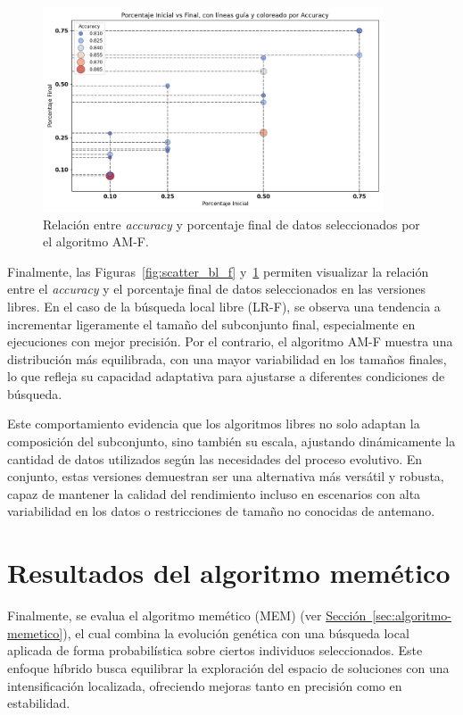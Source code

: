 \begin{figure}[htp]
    \centering
    \includegraphics[width=0.9\textwidth]{imagenes/evaluaciones/libres/scatter_gen_v2}
    \caption{Relación entre \textit{accuracy} y porcentaje final de datos seleccionados por el algoritmo AM-F.}
    \label{fig:scatter_gen_v2}
\end{figure}

Finalmente, las Figuras~\ref{fig:scatter_bl_f} y~\ref{fig:scatter_gen_v2} permiten visualizar la relación entre el \textit{accuracy}
y el porcentaje final de datos seleccionados en las versiones libres.
En el caso de la búsqueda local libre (LR-F), se observa una tendencia a incrementar ligeramente el tamaño del subconjunto final,
especialmente en ejecuciones con mejor precisión.
Por el contrario, el algoritmo AM-F muestra una distribución más equilibrada, con una mayor variabilidad en los tamaños finales,
lo que refleja su capacidad adaptativa para ajustarse a diferentes condiciones de búsqueda.

Este comportamiento evidencia que los algoritmos libres no solo adaptan la composición del subconjunto, sino también su escala,
ajustando dinámicamente la cantidad de datos utilizados según las necesidades del proceso evolutivo.
En conjunto, estas versiones demuestran ser una alternativa más versátil y robusta,
capaz de mantener la calidad del rendimiento incluso en escenarios con alta variabilidad en los datos o restricciones de tamaño no conocidas de antemano.


\section{Resultados del algoritmo memético}\label{sec:resultados-algoritmo-memetico}
Finalmente, se evalua el algoritmo memético (MEM) (ver \hyperref[sec:algoritmo-memetico]{Sección~\ref*{sec:algoritmo-memetico}}),
el cual combina la evolución genética con una búsqueda local aplicada de forma probabilística sobre ciertos individuos seleccionados.
Este enfoque híbrido busca equilibrar la exploración del espacio de soluciones con una intensificación localizada,
ofreciendo mejoras tanto en precisión como en estabilidad.


